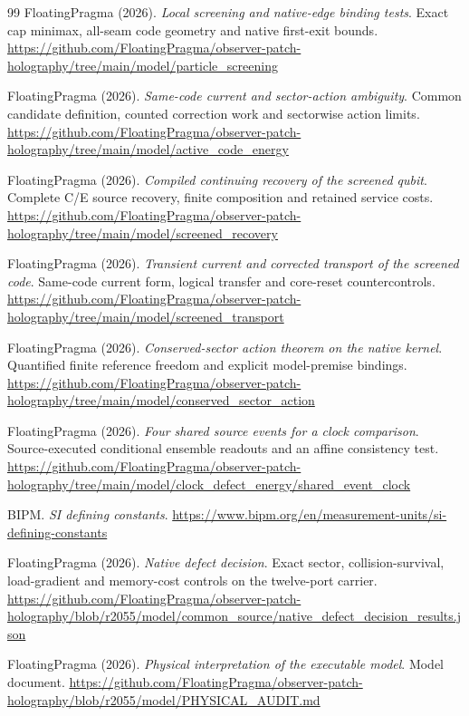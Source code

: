 \documentclass[11pt]{article}
\theoremstyle{definition}
\theoremstyle{remark}
\theoremstyle{plain}
\begin{document}
{\begin{thebibliography}{99}
FloatingPragma (2026). \emph{Local screening and native-edge binding tests}.
Exact cap minimax, all-seam code geometry and native first-exit bounds.
\url{https://github.com/FloatingPragma/observer-patch-holography/tree/main/model/particle_screening}

FloatingPragma (2026). \emph{Same-code current and sector-action ambiguity}.
Common candidate definition, counted correction work and sectorwise action limits.
\url{https://github.com/FloatingPragma/observer-patch-holography/tree/main/model/active_code_energy}

FloatingPragma (2026). \emph{Compiled continuing recovery of the screened qubit}.
Complete C/E source recovery, finite composition and retained service costs.
\url{https://github.com/FloatingPragma/observer-patch-holography/tree/main/model/screened_recovery}

FloatingPragma (2026). \emph{Transient current and corrected transport of the screened code}.
Same-code current form, logical transfer and core-reset countercontrols.
\url{https://github.com/FloatingPragma/observer-patch-holography/tree/main/model/screened_transport}

FloatingPragma (2026). \emph{Conserved-sector action theorem on the native kernel}.
Quantified finite reference freedom and explicit model-premise bindings.
\url{https://github.com/FloatingPragma/observer-patch-holography/tree/main/model/conserved_sector_action}

FloatingPragma (2026). \emph{Four shared source events for a clock comparison}.
Source-executed conditional ensemble readouts and an affine consistency test.
\url{https://github.com/FloatingPragma/observer-patch-holography/tree/main/model/clock_defect_energy/shared_event_clock}

BIPM. \emph{SI defining constants}.
\url{https://www.bipm.org/en/measurement-units/si-defining-constants}

FloatingPragma (2026). \emph{Native defect decision}. Exact sector,
collision-survival, load-gradient and memory-cost controls on the twelve-port
carrier.
\url{https://github.com/FloatingPragma/observer-patch-holography/blob/r2055/model/common_source/native_defect_decision_results.json}

FloatingPragma (2026). \emph{Physical interpretation of the executable
model}. Model document.
\url{https://github.com/FloatingPragma/observer-patch-holography/blob/r2055/model/PHYSICAL_AUDIT.md}


\end{thebibliography}}
\end{document}
